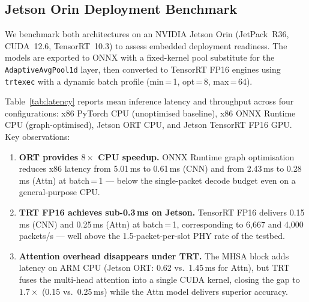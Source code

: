 \documentclass[conference]{IEEEtran}
\begin{document}
\subsection{Jetson Orin Deployment Benchmark}
\label{sec:deployment}

We benchmark both architectures on an NVIDIA Jetson Orin (JetPack~R36,
CUDA~12.6, TensorRT~10.3) to assess embedded deployment readiness.
The models are exported to ONNX with a fixed-kernel pool substitute
for the \texttt{AdaptiveAvgPool1d} layer, then converted to TensorRT
FP16 engines using \texttt{trtexec} with a dynamic batch profile
(min\,=\,1, opt\,=\,8, max\,=\,64).

Table~\ref{tab:latency} reports mean inference latency and throughput
across four configurations: x86 PyTorch CPU (unoptimised baseline),
x86 ONNX Runtime CPU (graph-optimised), Jetson ORT CPU, and Jetson
TensorRT FP16 GPU.  Key observations:

\begin{enumerate}[label=\arabic*.,leftmargin=*,itemsep=0pt]
  \item \textbf{ORT provides $8\times$ CPU speedup.}
    ONNX Runtime graph optimisation reduces x86 latency from 5.01\,ms
    to 0.61\,ms (CNN) and from 2.43\,ms to 0.28\,ms (Attn) at
    batch\,=\,1 — below the single-packet decode budget even on a
    general-purpose CPU.
  \item \textbf{TRT FP16 achieves sub-0.3\,ms on Jetson.}
    TensorRT FP16 delivers 0.15\,ms (CNN) and 0.25\,ms (Attn) at
    batch\,=\,1, corresponding to 6{,}667 and 4{,}000 packets/s —
    well above the 1.5-packet-per-slot PHY rate of the testbed.
  \item \textbf{Attention overhead disappears under TRT.}
    The MHSA block adds latency on ARM CPU (Jetson ORT: 0.62 vs.\
    1.45\,ms for Attn), but TRT fuses the multi-head attention into a
    single CUDA kernel, closing the gap to $1.7\times$ (0.15 vs.\
    0.25\,ms) while the Attn model delivers superior accuracy.
\end{enumerate}
\end{document}
